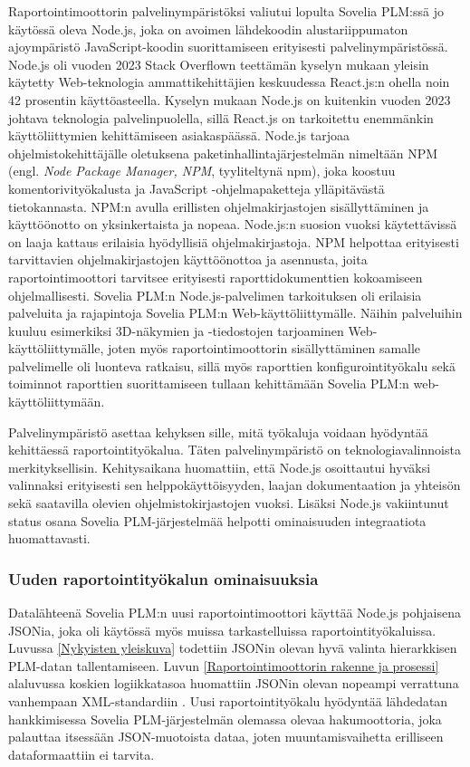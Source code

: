 Raportointimoottorin palvelinympäristöksi valiutui lopulta Sovelia PLM:ssä jo käytössä oleva Node.js, joka on avoimen lähdekoodin alustariippumaton ajoympäristö JavaScript-koodin suorittamiseen erityisesti palvelinympäristössä. Node.js oli vuoden 2023 Stack Overflown teettämän kyselyn mukaan yleisin käytetty Web-teknologia ammattikehittäjien keskuudessa React.js:n ohella noin 42 prosentin käyttöasteella. \cite{stackoverflowStackOverflow} Kyselyn mukaan Node.js on kuitenkin vuoden 2023 johtava teknologia palvelinpuolella, sillä React.js on tarkoitettu enemmänkin käyttöliittymien kehittämiseen asiakaspäässä. Node.js tarjoaa ohjelmistokehittäjälle oletuksena paketinhallintajärjestelmän nimeltään NPM (engl. \textit{Node Package Manager, NPM}, tyyliteltynä npm), joka koostuu komentorivityökalusta ja JavaScript -ohjelmapaketteja ylläpitävästä tietokannasta. NPM:n avulla erillisten ohjelmakirjastojen sisällyttäminen ja käyttöönotto on yksinkertaista ja nopeaa.\cite{npmjsAbout} Node.js:n suosion vuoksi käytettävissä on laaja kattaus erilaisia hyödyllisiä ohjelmakirjastoja. NPM helpottaa erityisesti tarvittavien ohjelmakirjastojen käyttöönottoa ja asennusta, joita raportointimoottori tarvitsee erityisesti raporttidokumenttien kokoamiseen ohjelmallisesti. Sovelia PLM:n Node.js-palvelimen tarkoituksen oli erilaisia palveluita ja rajapintoja Sovelia PLM:n Web-käyttöliittymälle. Näihin palveluihin kuuluu esimerkiksi 3D-näkymien ja -tiedostojen tarjoaminen Web-käyttöliittymälle, joten myös raportointimoottorin sisällyttäminen samalle palvelimelle oli luonteva ratkaisu, sillä myös raporttien konfigurointityökalu sekä toiminnot raporttien suorittamiseen tullaan kehittämään Sovelia PLM:n web-käyttöliittymään.

Palvelinympäristö asettaa kehyksen sille, mitä työkaluja voidaan hyödyntää kehittäessä raportointityökalua. Täten palvelinympäristö on teknologiavalinnoista merkityksellisin. Kehitysaikana huomattiin, että Node.js osoittautui hyväksi valinnaksi erityisesti sen helppokäyttöisyyden, laajan dokumentaation ja yhteisön sekä saatavilla olevien ohjelmistokirjastojen vuoksi. Lisäksi Node.js vakiintunut status osana Sovelia PLM-järjestelmää helpotti ominaisuuden integraatiota huomattavasti.

\subsubsection{Uuden raportointityökalun ominaisuuksia}

Datalähteenä Sovelia PLM:n uusi raportointimoottori käyttää Node.js pohjaisena JSONia, joka oli käytössä myös muissa tarkastelluissa raportointityökaluissa. Luvussa \ref{Nykyisten yleiskuva} todettiin JSONin olevan hyvä valinta hierarkkisen PLM-datan tallentamiseen. Luvun \ref{Raportointimoottorin rakenne ja prosessi} alaluvussa koskien logiikkatasoa huomattiin JSONin olevan nopeampi verrattuna vanhempaan XML-standardiin \cite{nurseitov_comparison_nodate}. Uusi raportointityökalu hyödyntää lähdedatan hankkimisessa Sovelia PLM-järjestelmän olemassa olevaa hakumoottoria, joka palauttaa itsessään JSON-muotoista dataa, joten muuntamisvaihetta erilliseen dataformaattiin ei tarvita.


